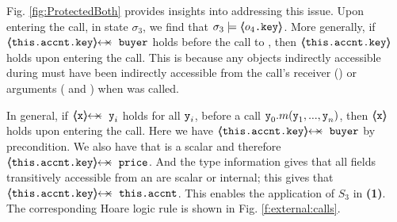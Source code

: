 Fig. \ref{fig:ProtectedBoth} provides insights into addressing this issue. Upon entering the call, in state $\sigma_3$, 
we find that $\sigma_3 \models \langle\!\!\langle o_4\mbox{\normalfont{\texttt{.key}}} \rangle\!\!\rangle$. More generally, if $\protectedFrom{\prg{this.\myAccount.key}}{\prg{buyer}}$ holds before the call to , then $\langle\!\!\langle \mbox{\normalfont{\texttt{this.\mbox{\normalfont{\texttt{accnt}}}.key}}} \rangle\!\!\rangle$ holds upon entering the call.
This is because any objects indirectly accessible during  must have been indirectly accessible from the call's
receiver () or  arguments ( and ) when  was called.
 
In general, if   $\protectedFrom{\prg{x}}{\prg{y}_i}$ holds  for all %
 $\mbox{\normalfont{\texttt{y}}}_i$, before a call $\mbox{\normalfont{\texttt{y}}}_0.m(\mbox{\normalfont{\texttt{y}}}_1, ..., \mbox{\normalfont{\texttt{y}}}_n)$, then $\langle\!\!\langle \mbox{\normalfont{\texttt{x}}} \rangle\!\!\rangle$ holds  upon entering the call. 
Here we have  $\protectedFrom{\prg{this.accnt.key}}{\prg{buyer}}$ by precondition. We also  have that  is a scalar and therefore 
$\protectedFrom{\prg{this.accnt.key}}{\prg{price}}$.  And the type information gives that
all fields transitively accessible from an  are scalar or internal; this gives that
$\protectedFrom{\prg{this.accnt.key}}{\prg{this.accnt}}$. 
This enables the application of $S_3$ in \textbf{(1)}. The corresponding Hoare logic rule is shown in Fig. \ref{f:external:calls}.

